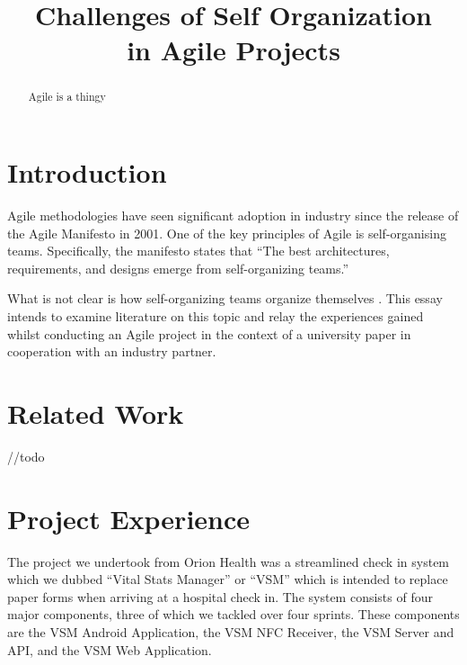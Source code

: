 \documentclass[conference]{IEEEtran}
\begin{document}
\title{Challenges of Self Organization\\in Agile Projects}


\author{
}


\maketitle


\begin{abstract}
Agile is a thingy
\end{abstract}


\section{Introduction}

Agile methodologies have seen significant adoption in industry since the release
of the Agile Manifesto \cite{fowler2001agile} in 2001. One of the key principles
of Agile is self-organising teams. Specifically, the manifesto states that ``The
best architectures, requirements, and designs emerge from self-organizing
teams.'' \cite{fowler2001agile}

What is not clear is how self-organizing teams organize themselves
\cite{hoda2010organizing}. This essay intends to examine literature on this
topic and relay the experiences gained whilst conducting an Agile project in the
context of a university paper in cooperation with an industry partner.

\section{Related Work}
//todo

\section{Project Experience}

The project we undertook from Orion Health was a streamlined check in system
which we dubbed ``Vital Stats Manager'' or ``VSM'' which is intended to replace
paper forms when arriving at a hospital check in. The system consists of four
major components, three of which we tackled over four sprints. These components
are the VSM Android Application, the VSM NFC Receiver, the VSM Server and API,
and the VSM Web Application.
\end{document}
